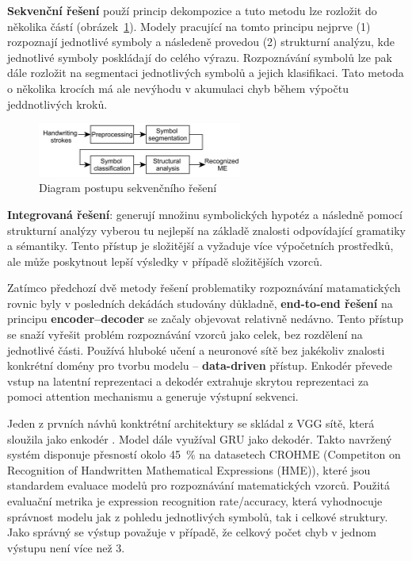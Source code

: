 \textbf{Sekvenční řešení} použí princip dekompozice a tuto metodu lze rozložit do několika částí (obrázek~\ref{img:seq_sol}). Modely pracující na tomto principu nejprve (1) rozpoznají jednotlivé symboly a následeně provedou (2) strukturní analýzu, kde jednotlivé symboly poskládají do celého výrazu. Rozpoznávání symbolů lze pak dále rozložit na segmentaci jednotlivých symbolů a jejich klasifikaci. Tato metoda o několika krocích má ale nevýhodu v akumulaci chyb během výpočtu jeddnotlivých kroků.

\begin{figure}[H]
    \centering
    \includegraphics[width=0.6\textwidth]{img/sequential_sol.png}
    \caption{Diagram postupu sekvenčního řešení}
    \label{img:seq_sol}
\end{figure}

\textbf{Integrovaná řešení}: generují množinu symbolických hypotéz a následně pomocí strukturní analýzy vyberou tu nejlepší na základě znalosti odpovídající gramatiky a sémantiky. Tento přístup je složitější a vyžaduje více výpočetních prostředků, ale může poskytnout lepší výsledky v případě složitějších vzorců.

Zatímco předchozí dvě metody řešení problematiky rozpoznávání matamatických rovnic byly v posledních dekádách studovány důkladně, \textbf{end-to-end řešení} na principu \textbf{encoder--decoder} se začaly objevovat relativně nedávno. Tento přístup se snaží vyřešit problém rozpoznávání vzorců jako celek, bez rozdělení na jednotlivé části. Používá hluboké učení a neuronové sítě bez jakékoliv znalosti konkrétní domény pro tvorbu modelu -- \textbf{data-driven} přístup. Enkodér převede vstup na latentní reprezentaci a dekodér extrahuje skrytou reprezentaci za pomoci attention mechanismu a generuje výstupní sekvenci. 

Jeden z prvních návhů konktrétní architektury se skládal z VGG sítě, která sloužila jako enkodér \cite{ZHANG_1}. Model dále využíval GRU jako dekodér. Takto navržený systém disponuje přesností okolo 45~\% na datasetech CROHME (Competiton on Recognition of Handwritten Mathematical Expressions (HME)), které jsou standardem evaluace modelů pro rozpoznávání matematických vzorců. Použitá evaluační metrika je expression recognition rate/accuracy, která vyhodnocuje správnost modelu jak z pohledu jednotlivých symbolů, tak i celkové struktury. Jako správný se výstup považuje v případě, že celkový počet chyb v jednom výstupu není více než 3. 

